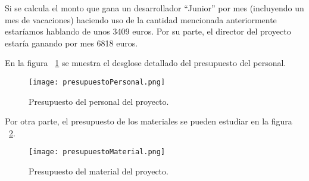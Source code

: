 Si se calcula el monto que gana un desarrollador ``Junior'' por mes (incluyendo un mes de vacaciones) haciendo uso de la cantidad mencionada anteriormente estaríamos hablando de unos 3409 euros. Por su parte, el director del proyecto estaría ganando por mes 6818 euros.

En la figura ~\ref{fig:presupuestoPersonal} se muestra el desglose detallado del presupuesto del personal.
 
\begin{figure}[tb]
\begin{center}
\texttt{[image: presupuestoPersonal.png]}
\caption{Presupuesto del personal del proyecto.}
\label{fig:presupuestoPersonal}
\end{center}
\end{figure}

Por otra parte, el presupuesto de los materiales se pueden estudiar en la figura ~\ref{fig:presupuestoMaterial}.

\begin{figure}[tb]
\begin{center}
\texttt{[image: presupuestoMaterial.png]}
\caption{Presupuesto del material del proyecto.}
\label{fig:presupuestoMaterial}
\end{center}
\end{figure}
